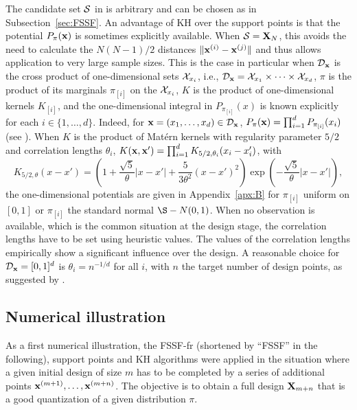 The candidate set $\mathcal{S}$ in  is arbitrary and can be chosen as in Subsection~\ref{sec:FSSF}. 
An advantage of KH over the support points is that the potential $P_{\pi}({\bf x})$ is sometimes explicitly available. 
When $\mathcal{S}={\bf X}_N$, this avoids the need to calculate the $N(N-1)/2$ distances $\|{\bf x}^{(i)}-{\bf x}^{(j)}\|$ and thus allows application to very large sample sizes. 
This is the case in particular when $\mathcal{D}_{\bf x}$ is the cross product of one-dimensional sets $\mathcal{X}_{x_i}$, i.e., $\mathcal{D}_{\bf x}=\mathcal{X}_{x_1}\times\cdots\times\mathcal{X}_{x_d}$, $\pi$ is the product of 
its marginals
$\pi_{[i]}$ on the $\mathcal{X}_{x_i}$, $K$ is the product of one-dimensional kernels $K_{[i]}$, and the one-dimensional integral in $P_{\pi_{[i]}}(x)$ is known explicitly for each $i\in\{1,\ldots,d\}$. 
Indeed, for ${\bf x}=(x_1,\ldots,x_d)\in\mathcal{D}_{\bf x}$, $P_{\pi}({\bf x})=\prod_{i=1}^d P_{\pi_{[i]}}(x_i)$ (see \citealp{pronzato_zhigljavsky_2020}). 
When $K$ is the product of Mat\'ern kernels with regularity parameter $5/2$ and correlation lengths $\theta_i$, $K({\bf x},{\bf x}') = \prod_{i=1}^{d} K_{5/2,\theta_{i}}(x_{i}-x'_i)$, with
\begin{equation}\label{eq:Matern5/2}
K_{5/2,\theta}(x-x')
=
\left(1 + \frac{\sqrt{5}}{\theta} |x - x'| + \frac{5}{3 \theta^2} (x - x')^2 \right)
\exp \left( - \frac{\sqrt{5}}{\theta} |x - x'| \right),
\end{equation}
the one-dimensional potentials are given in Appendix~\ref{apx:B} for $\pi_{[i]}$ uniform on $[0,1]$ or $\pi_{[i]}$ the standard normal $\S-N(0,1)$. 
When no observation is available, which is the common situation at the design stage, the correlation lengths have to be set using heuristic values. 
The values of the correlation lengths empirically show a significant influence over the design. 
A reasonable choice for $\mathcal{D}_{\bf x}=[0,1]^d$ is $\theta_i = n^{-1/d}$ for all $i$, with $n$ the target number of design points, as suggested by \citealp{pronzato_zhigljavsky_2020}. 

\subsection{Numerical illustration}\label{sec:numerical-1}

As a first numerical illustration, the FSSF-fr (shortened by ``FSSF'' in the following), support points and KH algorithms were applied in the situation where a given initial design of size $m$ has to be completed by a series of additional points ${\bf x}^{(m+1)},\ldots,{\bf x}^{(m+n)}$. 
The objective is to obtain a full design ${\bf X}_{m+n}$ that is a good quantization of a given distribution $\pi$. 

